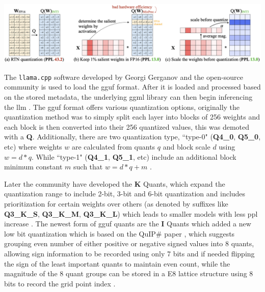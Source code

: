 \documentclass{ifacconf}
\begin{document}
	\begin{strip}
		\begin{minipage}{\textwidth}\centering
			\includegraphics[width=\linewidth, height=0.2\textheight]{awq}
			\label{fig:awq}
		\end{minipage}
	\end{strip}
	
	The \texttt{llama.cpp} software developed by Georgi Gerganov and the open-source community is used to load the \gls{gguf} format. After it is loaded and processed based on the stored metadata, the underlying \gls{ggml} library can then begin inferencing the \gls{llm} \cite{ggufgithub}. The \gls{gguf} format offers various quantization options, originally the quantization method was to simply split each layer into blocks of 256 weights and each block is then converted into their 256 quantized values, this was demoted with a \textbf{Q}. Additionally, there are two quantization type, ``type-0" (\textbf{Q4\_0}, \textbf{Q5\_0}, etc) where weights $w$ are calculated from quants $q$ and block scale $d$ using $w = d * q$. While ``type-1" (\textbf{Q4\_1}, \textbf{Q5\_1}, etc) include an additional block minimum constant $m$ such that $w = d * q + m$ \cite{ggufgithubquantdoc, ggufgithubkquantpr}. 
	
	Later the community have developed the \textbf{K} Quants, which expand the quantization range to include 2-bit, 3-bit and 6-bit quantization and includes prioritization for certain weights over others (as denoted by suffixes like \textbf{Q3\_K\_S}, \textbf{Q3\_K\_M}, \textbf{Q3\_K\_L}) which leads to smaller models with less \gls{ppl} increase \cite{ggufgithubkquantpr}. The newest form of \gls{gguf} quants are the \textbf{I} Quants which added a new low bit quantization \cite{ggufgithubiquantpr} which is based on the QuIP\# paper \cite{tseng2024quipbetterllmquantization}, which suggests grouping even number of either positive or negative signed values into 8 quants, allowing sign information to be recorded using only 7 bits and if needed flipping the sign of the least important quants to maintain even count, while the magnitude of the 8 quant groups can be stored in a E8 lattice structure using 8 bits to record the grid point index \cite{ggufgithubiquantpr}. 
	
\end{document}
